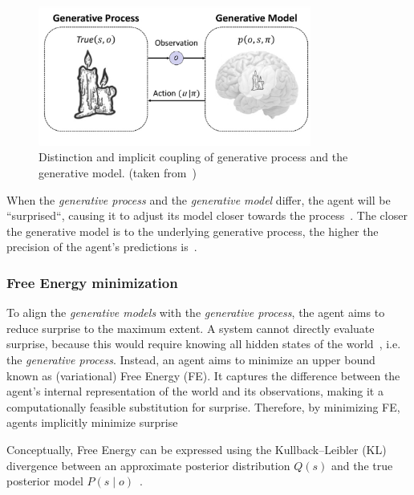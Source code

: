\begin{figure}[htbp]
    \centering
    \includegraphics[width=0.8\textwidth]{img/generative-model-generative-process.png}
    \caption{Distinction and implicit coupling of generative process and the generative model. (taken from~\cite{smith_step-by-step_2022})}
    \label{fig:generative-process-generative-model}
\end{figure}

When the \textit{generative process} and the \textit{generative model} differ, the agent will be ``surprised``, causing it to adjust its model closer towards the process~\cite{bruineberg_free-energy_2018}. The closer the generative model is to the underlying generative process, the higher the precision of the agent's predictions is~\cite{sedlak_active_2024}.

\subsubsection{Free Energy minimization}
To align the \textit{generative models} with the \textit{generative process}, the agent aims to reduce surprise to the maximum extent. A system cannot directly evaluate surprise, because this would require knowing all hidden states of the world~\cite{friston_free-energy_2009}, i.e. the \textit{generative process}. Instead, an agent aims to minimize an upper bound~\cite{smith_step-by-step_2022} known as (variational) Free Energy (FE). It captures the difference between the agent's internal representation of the world and its observations, making it a computationally feasible substitution for surprise. Therefore, by minimizing FE, agents implicitly minimize surprise~\cite{friston_free-energy_2010}

Conceptually, Free Energy can be expressed using the Kullback–Leibler (KL) divergence between an approximate posterior distribution \(Q(s)\) and the true posterior model \(P( s \mid o)\)~\cite{parr_active_2022,sajid_active_2021}.


